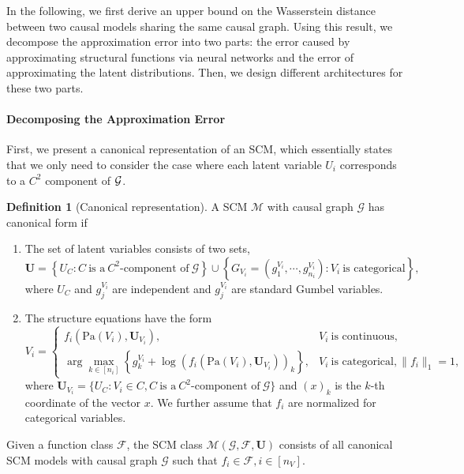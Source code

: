 \documentclass[12pt]{article}
\theoremstyle{plain}
\theoremstyle{definition}
\newtheorem{definition}[theorem]{Definition}
\theoremstyle{remark}
\begin{document}
In the following, we first derive an upper bound on the Wasserstein distance between two causal models sharing the same causal graph. Using this result, we decompose the approximation error into two parts: the error caused by approximating structural functions via neural networks and the error of approximating the latent distributions. Then, we design different architectures for these two parts.\par

\paragraph{Decomposing the Approximation Error} \label{sec:approximation_error}


First, we present a canonical representation of an SCM, which essentially states that we only need to consider the case where each latent variable $U_i$ corresponds to a $C^2$ component of ${\cal G}$. 
\begin{definition}[Canonical representation]
    A SCM $ \mathcal{M}$ with causal graph $ \mathcal{G}$ has canonical form if 
    \begin{enumerate}
        \item The set of latent variables consists of two sets,
\begin{equation*}
\boldsymbol{U} =\left\{U_{C} :C\ \text{is a} \ C^{2}\text{-component of} \ \mathcal{G}\right\} \cup \left\{G_{V_{i}} =( g^{V_{i}}_{1} ,\cdots ,g^{V_{i}}_{n_{i}}) :V_{i} \ \text{is categorical}\right\} ,
\end{equation*}
where $ U_{C}$ and $ g_j^{V_{i}}$ are independent and $  g_j^{V_{i}}$ are standard Gumbel variables. 
        \item The structure equations have the form
\begin{equation}\label{eq:structure_equation}
V_{i} =\begin{cases}
f_{i}\left(\text{Pa} (V_{i} ),\boldsymbol{U}_{V_{i}}\right) , & V_{i} \ \text{is continuous} ,\\
\arg\max_{k\in [ n_{i}]}\left\{g^{V_{i}}_{k} +\log\left( f_{i}\left(\text{Pa}( V_{i}) ,\boldsymbol{U}_{V_{i}}\right)\right)_{k}\right\} , & V_{i} \ \text{is categorical} , \|f_i\|_1=1 ,
\end{cases}
\end{equation}
where $ \boldsymbol{U}_{V_{i}} =\{U_{C} :V_{i} \in C, C \ \text{is a} \ C^{2}\text{-component of} \ \mathcal{G}\}$ and $(x)_k$ is the $k$-th coordinate of the vector $x$. We further assume that $f_i$ are normalized for categorical variables. 
    \end{enumerate}
    Given a function class $\mathcal{F}$, the SCM class $\mathcal{M} (\mathcal{G} ,\mathcal{F} ,\boldsymbol{U} )$ consists of all canonical SCM models with causal graph $\mathcal{G}$ such that $ f_{i} \in \mathcal{F} ,i\in [ n_{V}]$.
\end{definition}
\end{document}

